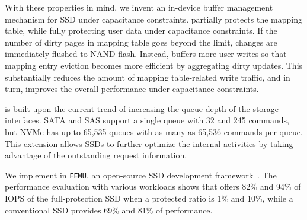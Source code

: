 
With these properties in mind, we invent an in-device buffer management mechanism for SSD under capacitance constraints. \ours{} partially protects the mapping table, 
while fully protecting user data under capacitance constraints. 
If the number of dirty pages in mapping table goes beyond the limit, 
changes are immediately flushed to NAND flash. 
Instead, \ours{} buffers more user writes so that mapping entry eviction becomes more efficient by aggregating dirty updates. 
This substantially reduces the amount of mapping table-related write traffic, and in turn, improves the overall performance under capacitance constraints. 

\ours{} is built upon the current trend of increasing the queue depth of the storage interfaces. SATA and SAS support a single queue with 32 and 245 commands, but NVMe has 
up to 65,535 queues with as many as 65,536 commands per queue. 
This extension allows SSDs to further optimize the internal activities by taking advantage of the outstanding request information.

We implement \ours{} in \texttt{FEMU}, an open-source SSD development framework~\cite{li2018case}.
The performance evaluation with various workloads shows that \ours{} offers 82\% and 94\% of IOPS of the full-protection SSD when a protected ratio is 1\% and 10\%, while a conventional SSD provides 69\% and 81\% of performance.  


\iffalse
However, in our design, we take a radically different approach. 
We buffer more user writes so that mapping entry eviction becomes more efficient by aggregating dirty updates. 
This substantially reduces the amount of mapping table-related write traffic, and in turn, improves the overall performance under capacitance constraints. 

\textcolor{red}{
The data maintained in the buffer can be classified into two types: the actual user data and 
the metadata for SSD management (i.e, mapping table). 
When the buffer is partially protected, the number of dirty pages is limited to 
the maximum amount of data that the on-board capacitance can protect. 
If the number of dirty pages goes beyond the limit, changes should be flushed to the flash memory immediately
to meet the durability constraint for SSDs. 
}
\fi

